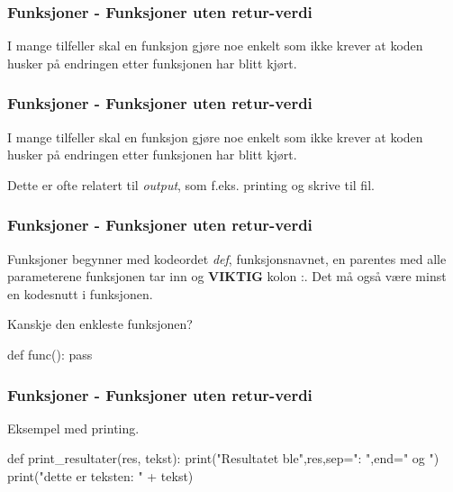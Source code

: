
\begin{frame}
    \frametitle{Funksjoner - Funksjoner uten retur-verdi}

    I mange tilfeller skal en funksjon gjøre noe enkelt som ikke krever at koden husker på endringen etter funksjonen har blitt kjørt. 

\end{frame}

\begin{frame}
    \frametitle{Funksjoner - Funksjoner uten retur-verdi}

    I mange tilfeller skal en funksjon gjøre noe enkelt som ikke krever at koden husker på endringen etter funksjonen har blitt kjørt. 

    Dette er ofte relatert til \textit{output}, som f.eks. printing og skrive til fil. 

\end{frame}

\begin{frame}[fragile]
    \frametitle{Funksjoner - Funksjoner uten retur-verdi}

    Funksjoner begynner med kodeordet \textit{def}, funksjonsnavnet, en parentes med alle parameterene funksjonen tar inn og \textbf{VIKTIG} kolon :. Det må også være minst en kodesnutt i funksjonen.

    Kanskje den enkleste funksjonen?

\begin{python}
def func():
    pass
\end{python}

\end{frame}

\begin{frame}[fragile]
    \frametitle{Funksjoner - Funksjoner uten retur-verdi}

    Eksempel med printing. 

\begin{python}
def print_resultater(res, tekst):
    print("Resultatet ble",res,sep=": ",end=" og ")
    print("dette er teksten: " + tekst)
\end{python}

\end{frame}

